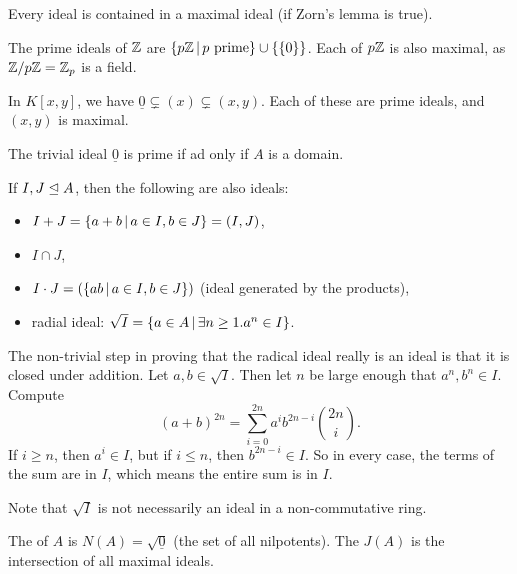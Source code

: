 \begin{remark}
  Every ideal is contained in a maximal ideal (if Zorn's lemma is true).
\end{remark}

\begin{example}
  The prime ideals of $\mathbb{Z}$ are $\{ p \mathbb{Z} \,|\, \text{$p$ prime} \} \cup \{ \{0\}
  \}$.
  Each of $p\mathbb{Z}$ is also maximal, as $\mathbb{Z} / p \mathbb{Z} = \mathbb{Z}_p$ is a field.
\end{example}

\begin{example}
  In $K[x,y]$, we have $\underline{0} \subsetneq (x) \subsetneq (x,y)$.
  Each of these are prime ideals, and $(x,y)$ is maximal.
\end{example}

\begin{remark}
  The trivial ideal $\underline{0}$ is prime if ad only if $A$ is a domain.
\end{remark}

\begin{definition}
  If $I, J \trianglelefteq A$, then the following are also ideals:
  \begin{itemize}
  \item $I + J = \{ a + b \,|\, a \in I, b \in J \} = (I,J)$,
  \item $I \cap J$,
  \item $I \cdot J = (\{ ab \,|\, a \in I, b \in J \})$ (ideal generated by the
	products),
  \item radial ideal: $\sqrt{I} = \{ a \in A \,|\, \exists n \ge 1 . a^n \in I
	\}$.
  \end{itemize}
\end{definition}

\begin{remark}
  The non-trivial step in proving that the radical ideal really is an ideal is
  that it is closed under addition.
  Let $a, b \in \sqrt{I}$.
  Then let $n$ be large enough that $a^n, b^n \in I$.
  Compute
  \[
	(a+b)^{2n} = \sum_{i=0}^{2n} a^i b^{2n-i} \binom{2n}{i}.
  \]
  If $i \ge n$, then $a^i \in I$, but if $i \le n$, then $b^{2n-i} \in I$.
  So in every case, the terms of the sum are in $I$, which means the entire sum
  is in $I$.
\end{remark}

\begin{remark}
  Note that $\sqrt{I}$ is not necessarily an ideal in a non-commutative ring.
\end{remark}

\begin{definition}
  The  of $A$ is $N(A) = \sqrt{\underline{0}}$ (the set of all
  nilpotents).
  The  $J(A)$ is the intersection of all maximal ideals.
\end{definition}

